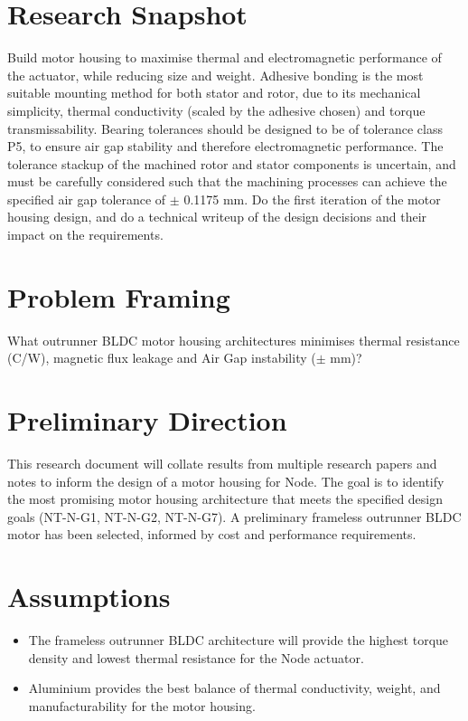 \documentclass[internal]{../../../classes/nervtech-research}
\begin{document}
\maketitle
\tableofcontents
\newpage

\section{Research Snapshot}
\researchsnapshot
{Build motor housing to maximise thermal and electromagnetic performance of the actuator, while reducing size and weight.}
{Adhesive bonding is the most suitable mounting method for both stator and rotor, due to its mechanical simplicity, thermal conductivity (scaled by the adhesive chosen) and torque transmissability.
Bearing tolerances should be designed to be of tolerance class P5, to ensure air gap stability and therefore electromagnetic performance.}
{The tolerance stackup of the machined rotor and stator components is uncertain, and must be carefully considered such that the machining processes can achieve the specified air gap tolerance of $\pm$ 0.1175 mm.}
{Do the first iteration of the motor housing design, and do a technical writeup of the design decisions and their impact on the requirements.}

\section{Problem Framing}
\begin{researchquestion}
  What outrunner BLDC motor housing architectures minimises thermal resistance (\textdegree C/W), magnetic flux leakage and Air Gap instability ($\pm$ mm)?
\end{researchquestion}

\section{Preliminary Direction}
This research document will collate results from multiple research papers and notes to inform the design of a motor housing for Node.
The goal is to identify the most promising motor housing architecture that meets the specified design goals (NT-N-G1, NT-N-G2, NT-N-G7).
A preliminary frameless outrunner BLDC motor has been selected, informed by cost and performance requirements.

\section{Assumptions}
\begin{itemize}
  \item The frameless outrunner BLDC architecture will provide the highest torque density and lowest thermal resistance for the Node actuator.
  \item Aluminium provides the best balance of thermal conductivity, weight, and manufacturability for the motor housing.
\end{itemize}
\end{document}
